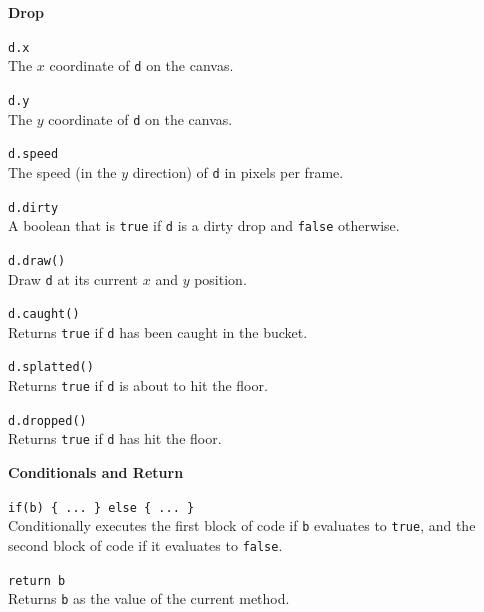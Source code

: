 \documentclass[10pt,twocolumn]{article}
\begin{document}
\thispagestyle{empty}


\noindent\textbf{\large Drop}
\begin{description}
\item{\texttt{d.x}}\ \\[.25em]
%
  The $x$ coordinate of \texttt{d} on the canvas. 

\item{\texttt{d.y}}\ \\[.25em]
%
  The $y$ coordinate of \texttt{d} on the canvas. 

\item{\texttt{d.speed}}\ \\[.25em]
%
  The speed (in the $y$ direction) of \texttt{d} in pixels per frame. 

\item{\texttt{d.dirty}}\ \\[.25em]
%
  A boolean that is \texttt{true} if \texttt{d} is a dirty drop and \texttt{false} otherwise.

\item{\texttt{d.draw()}}\ \\[.25em]
%
  Draw \texttt{d} at its current $x$ and $y$ position.

\item{\texttt{d.caught()}}\ \\[.25em]
%
  Returns \texttt{true} if \texttt{d} has been caught in the bucket.

\item{\texttt{d.splatted()}}\ \\[.25em]
%
  Returns \texttt{true} if \texttt{d} is about to hit the floor.

\item{\texttt{d.dropped()}}\ \\[.25em]
%
  Returns \texttt{true} if \texttt{d} has hit the floor.

\end{description}

\medskip

\noindent\textbf{\large Conditionals and Return}
\begin{description}

\item{\texttt{if(b) \{ ... \} else \{ ... \}}}\ \\[.25em] 
% 
Conditionally executes the first block of code if \texttt{b} evaluates to
\texttt{true}, and the second block of code if it evaluates to \texttt{false}.

\item{\texttt{return b}} \ \\[.25em]
%
  Returns \texttt{b} as the value of the current method.
\end{description}
\end{document}
